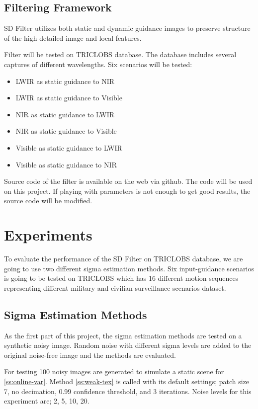 \documentclass[10pt,twocolumn,letterpaper]{article}
\begin{document}
\subsection{Filtering Framework}\label{ss:filter-framework}
SD Filter\cite{ham2015} utilizes both static and dynamic guidance images to preserve structure of the high detailed image and local features.

Filter will be tested on TRICLOBS\cite{triclobs} database. The database includes several captures of different wavelengths. Six scenarios will be tested:
\begin{itemize}
	\item LWIR as static guidance to NIR
	\item LWIR as static guidance to Visible
	\item NIR as static guidance to LWIR
	\item NIR as static guidance to Visible
	\item Visible as static guidance to LWIR
	\item Visible as static guidance to NIR
\end{itemize}

Source code of the filter is available on the web via github\cite{github:sdfilter}. The code will be used on this project. If playing with parameters is not enough to get good results, the source code will be modified.

\section{Experiments}

To evaluate the performance of the SD Filter\cite{ham2015} on TRICLOBS \cite{triclobs} database, we are going to use two different sigma estimation methods. Six input-guidance scenarios is going to be tested on TRICLOBS\cite{triclobs} which has  16 different motion sequences representing different military and civilian surveillance scenarios dataset.

\subsection{Sigma Estimation Methods}
As the first part of this project, the sigma estimation methods are tested on a synthetic noisy image. Random noise with different sigma levels are added to the original noise-free image and the methods are evaluated.

For testing 100 noisy images are generated to simulate a static scene for \ref{ss:online-var}. Method \ref{ss:weak-tex} is called with its default settings; patch size 7, no decimation, 0.99 confidence threshold, and 3 iterations. Noise levels for this experiment are; 2, 5, 10, 20.
\end{document}

